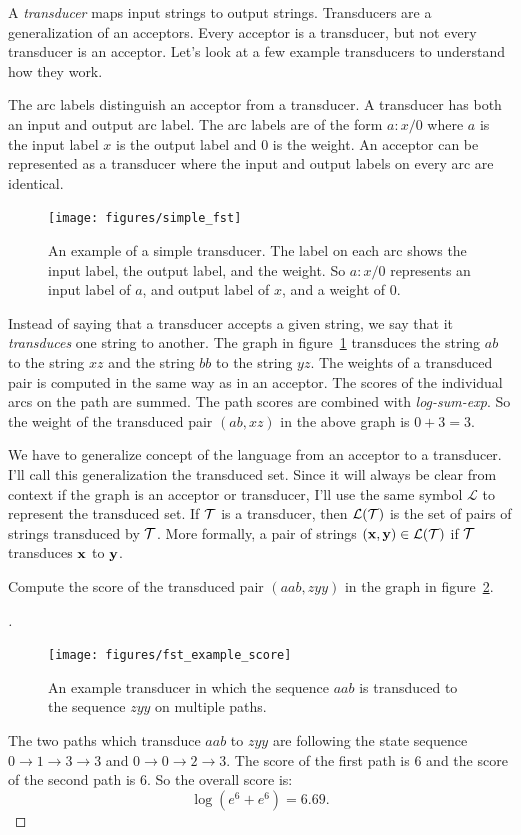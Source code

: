 \documentclass[main.tex]{subfiles}
\begin{document}
A \emph{transducer} maps input strings to output strings. Transducers are a
generalization of an acceptors. Every acceptor is a transducer, but not every
transducer is an acceptor. Let's look at a few example transducers to
understand how they work.

The arc labels distinguish an acceptor from a transducer. A transducer has both
an input and output arc label. The arc labels are of the form $a\!:\!x/0$ where
$a$ is the input label $x$ is the output label and $0$ is the weight. An
acceptor can be represented as a transducer where the input and output labels
on every arc are identical.

\begin{figure}
    \centering
    \texttt{[image: figures/simple\_fst]}
    \caption{An example of a simple transducer. The label on each arc shows the
    input label, the output label, and the weight. So $a\!:\!x/0$ represents an
    input label of $a$, and output label of $x$, and a weight of $0$.}
    \label{fig:simple_fst}
\end{figure}

Instead of saying that a transducer accepts a given string, we say that it
\emph{transduces} one string to another. The graph in
figure~\ref{fig:simple_fst} transduces the string $ab$ to the string $xz$ and
the string $bb$ to the string $yz$. The weights of a transduced pair is
computed in the same way as in an acceptor. The scores of the individual arcs
on the path are summed. The path scores are combined with \emph{log-sum-exp}.
So the weight of the transduced pair $(ab, xz)$ in the above graph is $0+3 =
3$.

We have to generalize concept of the language from an acceptor to a transducer.
I'll call this generalization the transduced set. Since it will always be clear
from context if the graph is an acceptor or transducer, I'll use the same
symbol $\mathcal{L}$ to represent the transduced set. If $\mathcal{T}$ is a transducer,
then $\mathcal{L}(\mathcal{T})$ is the set of pairs of strings transduced by $\mathcal{T}$.
More formally, a pair of strings $({\bf x}, {\bf y}) \in \mathcal{L}(\mathcal{T})$ if $\mathcal{T}$
transduces ${\bf x}$ to ${\bf y}$.

\begin{example}
Compute the score of the transduced pair $(aab, zyy)$ in the graph in
figure~\ref{fig:fst_example_score}.
\end{example}

\begin{proof}[\unskip\nopunct]
\begin{figure}
    \centering
    \texttt{[image: figures/fst\_example\_score]}
    \caption{An example transducer in which the sequence $aab$ is transduced to
    the sequence $zyy$ on multiple paths.}
    \label{fig:fst_example_score}
\end{figure}

The two paths which transduce $aab$ to $zyy$ are following the state sequence
$0 \rightarrow 1 \rightarrow 3 \rightarrow 3$ and $0 \rightarrow 0 \rightarrow
2 \rightarrow 3$. The score of the first path is $6$ and the score of the
second path is $6$. So the overall score is:
$$
\log \left(e^6 + e^6\right) = 6.69.
$$
\end{proof}
\end{document}
